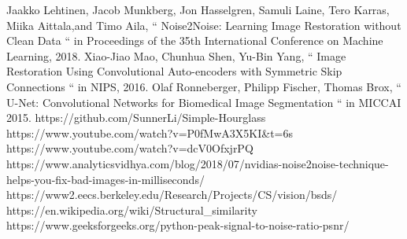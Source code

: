 \documentclass[journal]{IEEEtran} %
\begin{document}
\begin{thebibliography}{00}
     Jaakko Lehtinen, Jacob Munkberg, Jon Hasselgren, Samuli Laine, Tero Karras, Miika Aittala,and Timo  Aila, `` Noise2Noise: Learning Image Restoration without Clean Data `` in Proceedings of the 35th International Conference on Machine Learning, 2018.
     Xiao-Jiao Mao, Chunhua Shen, Yu-Bin Yang, `` Image Restoration Using Convolutional Auto-encoders with Symmetric Skip Connections `` in NIPS, 2016.
     Olaf Ronneberger, Philipp Fischer, Thomas Brox, `` U-Net: Convolutional Networks for Biomedical Image Segmentation `` in MICCAI 2015.
     https://github.com/SunnerLi/Simple-Hourglass
     https://www.youtube.com/watch?v=P0fMwA3X5KI&t=6s
     https://www.youtube.com/watch?v=dcV0OfxjrPQ
     https://www.analyticsvidhya.com/blog/2018/07/nvidias-noise2noise-technique-helps-you-fix-bad-images-in-milliseconds/
     https://www2.eecs.berkeley.edu/Research/Projects/CS/vision/bsds/
     https://en.wikipedia.org/wiki/Structural\_similarity
     https://www.geeksforgeeks.org/python-peak-signal-to-noise-ratio-psnr/
\end{thebibliography}
\vspace{12pt}
\end{document}
